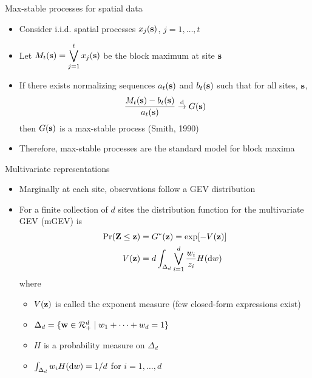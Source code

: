 \documentclass{beamer}
\begin{document}
\begin{frame}{Max-stable processes for spatial data}
	\begin{itemize} \setlength{\itemsep}{1em}
		\item Consider i.i.d. spatial processes $x_j(\mathbf{s})$, $j = 1, \ldots, t$
		\item Let $M_t(\mathbf{s}) = \displaystyle\bigvee_{j=1}^t x_j(\mathbf{s})$ be the block maximum at site $\mathbf{s}$
		\item If there exists normalizing sequences $a_t(\mathbf{s})$ and $b_t(\mathbf{s})$ such that for all sites, $\mathbf{s}$,
		\begin{align*}
			\frac{M_t(\mathbf{s}) - b_t(\mathbf{s})}{a_t(\mathbf{s})} \stackrel{\mathrm{d}}{\rightarrow} G(\mathbf{s})
		\end{align*}
		then $G(\mathbf{s})$ is a max-stable process (Smith, 1990)
		\item Therefore, max-stable processes are the standard model for block maxima
	\end{itemize}
\end{frame}

\begin{frame}{Multivariate representations}
	\begin{itemize} \setlength{\itemsep}{1em}
		\item Marginally at each site, observations follow a GEV distribution
		\item For a finite collection of $d$ sites the distribution function for the multivariate GEV (mGEV) is
		\begin{align*}
			\Pr(\mathbf{Z} \le \mathbf{z})  &= G^*(\mathbf{z}) = \exp[-V(\mathbf{z})]\\
			V(\mathbf{z})    &= d \int_{\Delta_d} \bigvee_{i = 1}^d \frac{w_i}{z_i} H(\text{d} w)
		\end{align*}
		where
		\begin{itemize} \setlength{\itemsep}{0.25em}
			\item $V(\mathbf{z})$ is called the exponent measure (few closed-form expressions exist)
			\item $\Delta_d = \{ \mathbf{w} \in {\cal R}^d_+ \mid w_1 + \cdots + w_d = 1\}$
			\item $H$ is a probability measure on $\Delta_d$
			\item $\int_{\Delta_d}w_i H(\text{d} w) = 1 / d$ for $i = 1, \ldots, d$
		\end{itemize}
	\end{itemize}
\end{frame}
\end{document}
